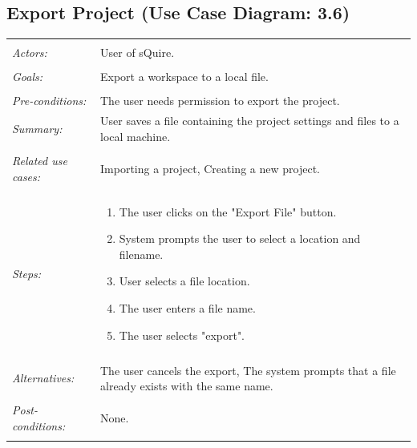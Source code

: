 \documentclass[11pt]{report}
\begin{document}
\subsection{Export Project (Use Case Diagram: 3.6)}
\begin{tabular}{ p{2cm} p{12cm} }
\hline
\\
\textit{Actors:} & User of sQuire.\\
\\
\textit{Goals:} & Export a workspace to a local file. \\
\\
\textit{Pre-conditions:} & The user needs permission to export the project. 
\\
\textit{Summary:} & User saves a file containing the project settings and files to a local machine. \\
\\
\textit{Related use cases:} & Importing a project, Creating a new project. \\
\\
\textit{Steps:} & \begin{enumerate}
 \item The user clicks on the "Export File" button. 
 \item System prompts the user to select a location and filename. 
 \item User selects a file location.
 \item The user enters a file name.
 \item The user selects "export". 
 \end{enumerate}\\
 \\
 \textit{Alternatives:} & The user cancels the export, The system prompts that a file already exists with the same name.\\
 \\
 \textit{Post-conditions:} & None. \\
 \\
\hline
\end{tabular}
\end{document}
